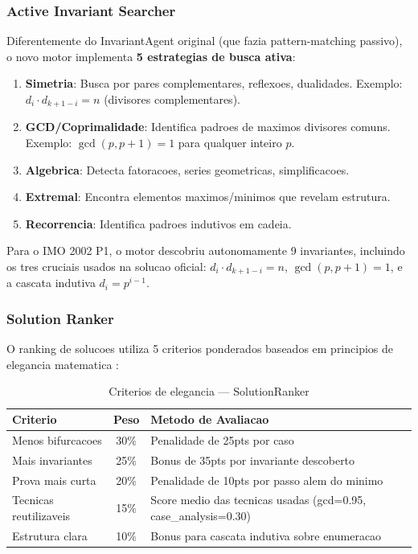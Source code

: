 \documentclass[5p]{elsarticle}
\begin{document}
\subsubsection{Active Invariant Searcher}

Diferentemente do InvariantAgent original (que fazia pattern-matching passivo),
o novo motor implementa \textbf{5 estrategias de busca ativa}:

\begin{enumerate}[label=(\alph*)]
  \item \textbf{Simetria}: Busca por pares complementares, reflexoes, dualidades.
    Exemplo: $d_i \cdot d_{k+1-i} = n$ (divisores complementares).
  \item \textbf{GCD/Coprimalidade}: Identifica padroes de maximos divisores comuns.
    Exemplo: $\gcd(p, p+1) = 1$ para qualquer inteiro $p$.
  \item \textbf{Algebrica}: Detecta fatoracoes, series geometricas, simplificacoes.
  \item \textbf{Extremal}: Encontra elementos maximos/minimos que revelam estrutura.
  \item \textbf{Recorrencia}: Identifica padroes indutivos em cadeia.
\end{enumerate}

Para o IMO 2002 P1, o motor descobriu autonomamente 9 invariantes, incluindo
os tres cruciais usados na solucao oficial: $d_i\cdot d_{k+1-i}=n$,
$\gcd(p,p+1)=1$, e a cascata indutiva $d_i=p^{i-1}$.

\subsubsection{Solution Ranker}

O ranking de solucoes utiliza 5 criterios ponderados baseados em principios
de elegancia matematica \cite{hardy1940,polya1954}:

\begin{table}[H]
  \centering
  \caption{Criterios de elegancia — SolutionRanker}
  \label{tab:ranker}
  \begin{tabular}{lcp{5cm}}
    \toprule
    \textbf{Criterio} & \textbf{Peso} & \textbf{Metodo de Avaliacao} \\
    \midrule
    Menos bifurcacoes & 30\% & Penalidade de 25pts por caso \\
    Mais invariantes & 25\% & Bonus de 35pts por invariante descoberto \\
    Prova mais curta & 20\% & Penalidade de 10pts por passo alem do minimo \\
    Tecnicas reutilizaveis & 15\% & Score medio das tecnicas usadas (gcd=0.95, case\_analysis=0.30) \\
    Estrutura clara & 10\% & Bonus para cascata indutiva sobre enumeracao \\
    \bottomrule
  \end{tabular}
\end{table}
\end{document}
